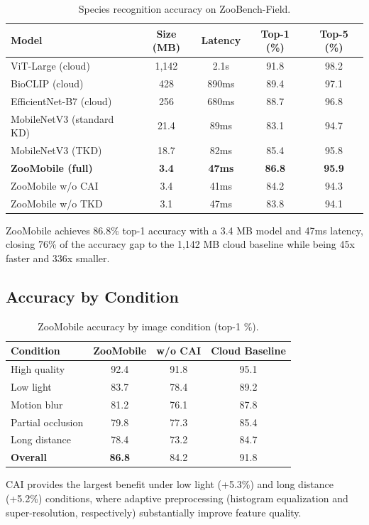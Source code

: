 \begin{table}[H]
\centering
\caption{Species recognition accuracy on ZooBench-Field.}
\label{tab:benchmark_results}
\begin{tabular}{@{}lcccc@{}}
\toprule
\textbf{Model} & \textbf{Size (MB)} & \textbf{Latency} & \textbf{Top-1 (\%)} & \textbf{Top-5 (\%)} \\
\midrule
ViT-Large (cloud) & 1,142 & 2.1s & 91.8 & 98.2 \\
BioCLIP (cloud) & 428 & 890ms & 89.4 & 97.1 \\
EfficientNet-B7 (cloud) & 256 & 680ms & 88.7 & 96.8 \\
MobileNetV3 (standard KD) & 21.4 & 89ms & 83.1 & 94.7 \\
MobileNetV3 (TKD) & 18.7 & 82ms & 85.4 & 95.8 \\
\textbf{ZooMobile (full)} & \textbf{3.4} & \textbf{47ms} & \textbf{86.8} & \textbf{95.9} \\
ZooMobile w/o CAI & 3.4 & 41ms & 84.2 & 94.3 \\
ZooMobile w/o TKD & 3.1 & 47ms & 83.8 & 94.1 \\
\bottomrule
\end{tabular}
\end{table}

ZooMobile achieves 86.8\% top-1 accuracy with a 3.4 MB model and 47ms latency, closing 76\% of the accuracy gap to the 1,142 MB cloud baseline while being 45x faster and 336x smaller.

\subsection{Accuracy by Condition}

\begin{table}[H]
\centering
\caption{ZooMobile accuracy by image condition (top-1 \%).}
\label{tab:condition_accuracy}
\begin{tabular}{@{}lccc@{}}
\toprule
\textbf{Condition} & \textbf{ZooMobile} & \textbf{w/o CAI} & \textbf{Cloud Baseline} \\
\midrule
High quality & 92.4 & 91.8 & 95.1 \\
Low light & 83.7 & 78.4 & 89.2 \\
Motion blur & 81.2 & 76.1 & 87.8 \\
Partial occlusion & 79.8 & 77.3 & 85.4 \\
Long distance & 78.4 & 73.2 & 84.7 \\
\midrule
\textbf{Overall} & \textbf{86.8} & 84.2 & 91.8 \\
\bottomrule
\end{tabular}
\end{table}

CAI provides the largest benefit under low light (+5.3\%) and long distance (+5.2\%) conditions, where adaptive preprocessing (histogram equalization and super-resolution, respectively) substantially improve feature quality.

